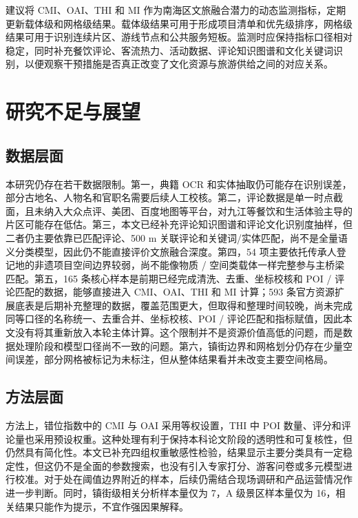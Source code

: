 建议将 CMI、OAI、THI 和 MI 作为南海区文旅融合潜力的动态监测指标，定期更新载体级和网格级结果。载体级结果可用于形成项目清单和优先级排序，网格级结果可用于识别连续片区、游线节点和公共服务短板。监测时应保持指标口径相对稳定，同时补充餐饮评论、客流热力、活动数据、评论知识图谱和文化关键词识别，以便观察干预措施是否真正改变了文化资源与旅游供给之间的对应关系。

\section{研究不足与展望}\label{ux7814ux7a76ux4e0dux8db3ux4e0eux5c55ux671b}

\subsection{数据层面}\label{ux6570ux636eux5c42ux9762}

本研究仍存在若干数据限制。第一，典籍 OCR 和实体抽取仍可能存在识别误差，部分古地名、人物名和官职名需要后续人工校核。第二，评论数据是单一时点截面，且未纳入大众点评、美团、百度地图等平台，对九江等餐饮和生活体验主导的片区可能存在低估。第三，本文已经补充评论知识图谱和评论文化识别度抽样，但二者仍主要依靠已匹配评论、500 m 关联评论和关键词/实体匹配，尚不是全量语义分类模型，因此仍不能直接评价文旅融合深度。第四，54 项主要依托传承人登记地的非遗项目空间边界较弱，尚不能像物质 / 空间类载体一样完整参与主桥梁匹配。第五，165 条核心样本是前期已经完成清洗、去重、坐标校核和 POI / 评论匹配的数据，能够直接进入 CMI、OAI、THI 和 MI 计算；593 条官方资源扩展底表是后期补充整理的数据，覆盖范围更大，但取得和整理时间较晚，尚未完成同等口径的名称统一、去重合并、坐标校核、POI / 评论匹配和指标赋值，因此本文没有将其重新放入本轮主体计算。这个限制并不是资源价值高低的问题，而是数据处理阶段和模型口径尚不一致的问题。第六，镇街边界和网格划分仍存在少量空间误差，部分网格被标记为未标注，但从整体结果看并未改变主要空间格局。

\subsection{方法层面}\label{ux65b9ux6cd5ux5c42ux9762}

方法上，错位指数中的 CMI 与 OAI 采用等权设置，THI 中 POI 数量、评分和评论量也采用预设权重。这种处理有利于保持本科论文阶段的透明性和可复核性，但仍然具有简化性。本文已补充四组权重敏感性检验，结果显示主要分类具有一定稳定性，但这仍不是全面的参数搜索，也没有引入专家打分、游客问卷或多元模型进行校准。对于处在阈值边界附近的样本，后续仍需结合现场调研和产品运营情况作进一步判断。同时，镇街级相关分析样本量仅为 7，A 级景区样本量仅为 16，相关结果只能作为提示，不宜作强因果解释。


